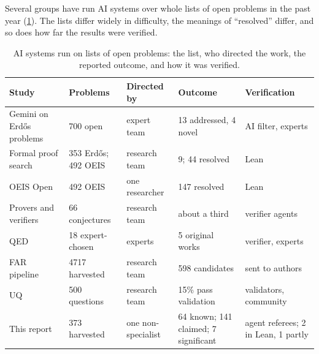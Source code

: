 \documentclass[11pt]{amsart}
\begin{document}
Several groups have run AI systems over whole lists of open problems in the
past year (\cref{tab:compare}). The lists differ widely in difficulty, the
meanings of ``resolved'' differ, and so does how far the results were verified.

\begin{table}[ht]
  \centering
  \small
  \begin{tabular}{p{}p{}p{}p{}p{}}
    \toprule
    Study                                & Problems            & Directed by        & Outcome                              & Verification                        \\
    \midrule
    Gemini on Erdős problems~\cite{feng} & 700 open            & expert team        & 13 addressed, 4 novel                & AI filter, experts                  \\
    Formal proof search~\cite{tsoukalas} & 353 Erdős; 492 OEIS & research team      & 9; 44 resolved                       & Lean                                \\
    OEIS Open~\cite{adamczewski}         & 492 OEIS            & one researcher     & 147 resolved                         & Lean                                \\
    Provers and verifiers~\cite{leduc}   & 66 conjectures      & research team      & about a third                        & verifier agents                     \\
    QED~\cite{qed}                       & 18 expert-chosen    & experts            & 5 original works                     & verifier, experts                   \\
    FAR pipeline~\cite{far}              & 4717 harvested      & research team      & 598 candidates                       & sent to authors                     \\
    UQ~\cite{uq}                         & 500 questions       & research team      & 15\% pass validation                 & validators, community               \\
    This report                          & 373 harvested       & one non-specialist & 64 known; 141 claimed; 7 significant & agent referees; 2 in Lean, 1 partly \\
    \bottomrule
  \end{tabular}
  \caption{AI systems run on lists of open problems: the list, who directed
    the work, the reported outcome, and how it was verified.}\label{tab:compare}
\end{table}
\end{document}
